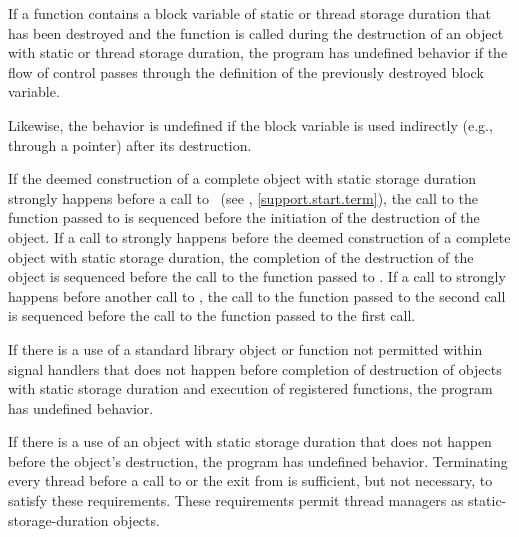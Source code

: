 \pnum
If a function contains a block variable of static or thread storage duration that has been
destroyed and the function is called during the destruction of an object with static or
thread storage duration, the program has undefined behavior if the flow of control
%
%
%
%
%
passes through the definition of the previously destroyed block variable.
\begin{note}
Likewise, the behavior is undefined
if the block variable is used indirectly (e.g., through a pointer)
after its destruction.
\end{note}

\pnum
{}%
%
If the deemed construction of a complete object with static storage
duration strongly happens before a call to ~(see
, \ref{support.start.term}), the call to the function passed to
 is sequenced before the initiation of the destruction of the object.
If a call to  strongly happens before the deemed construction of
a complete object with static storage duration,
the completion of the destruction of the
object is sequenced before the call to the function passed to . If a
call to  strongly happens before another call to , the
call to the function passed to the second  call is sequenced before
the call to the function passed to the first  call.

\pnum
If there is a use of a standard library object or function not permitted within signal
handlers that does not happen before
completion of destruction of objects with static storage duration and execution of
 registered functions, the program has
undefined behavior.
\begin{note}
If there is a use of an object with static storage
duration that does not happen before the object's destruction, the program has undefined
behavior. Terminating every thread before a call to  or the exit from
 is sufficient, but not necessary, to satisfy these requirements. These
requirements permit thread managers as static-storage-duration objects.
\end{note}

